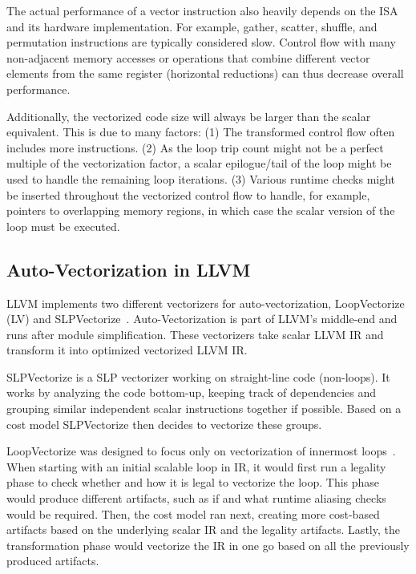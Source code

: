 \documentclass[sigplan,11pt,nonacm]{acmart}
\begin{document}
The actual performance of a vector instruction also heavily depends on the ISA and its 
hardware implementation. 
For example, gather, scatter, 
shuffle, and permutation instructions are typically considered slow. Control flow with many 
non-adjacent memory accesses or 
operations that combine different vector elements from the same register (horizontal reductions) can thus 
decrease overall performance.

Additionally, the vectorized code size will always be larger than the scalar equivalent. This is
due to many factors: (1) The transformed control flow often includes more instructions.
(2) As the loop trip count might not be a perfect multiple of the vectorization factor, a scalar
epilogue/tail of the loop might be used to handle the remaining loop iterations. (3) Various runtime
checks might be inserted throughout the vectorized control flow to handle, for example, pointers 
to overlapping memory regions, in which case the scalar version of the loop must be executed.

\subsection{Auto-Vectorization in LLVM}
LLVM implements two different vectorizers for auto-vectorization, LoopVectorize (LV)
and SLPVectorize~\cite{llvmvec,llvmhistorystate}. Auto-Vectorization is part of LLVM's 
middle-end and runs after module simplification.
These vectorizers take scalar LLVM IR and transform it into optimized vectorized 
LLVM IR.

SLPVectorize is a SLP vectorizer working on straight-line code (non-loops). It works by analyzing
the code bottom-up, keeping track of dependencies and grouping similar independent scalar instructions
together if possible. Based on a cost model SLPVectorize then decides to vectorize these groups.

LoopVectorize was designed to focus only on vectorization of innermost loops~\cite{llvmintrvplan}. 
When starting with an initial scalable loop in IR, it would first run a legality phase to check 
whether and how it is legal to vectorize the loop. This phase would produce different artifacts, 
such as if 
and what runtime aliasing checks would be required. Then, the cost model ran next, creating more 
cost-based artifacts based on the underlying scalar IR and the legality artifacts. 
Lastly, the transformation phase would vectorize 
the IR in one go based on all the previously produced artifacts.
\end{document}
